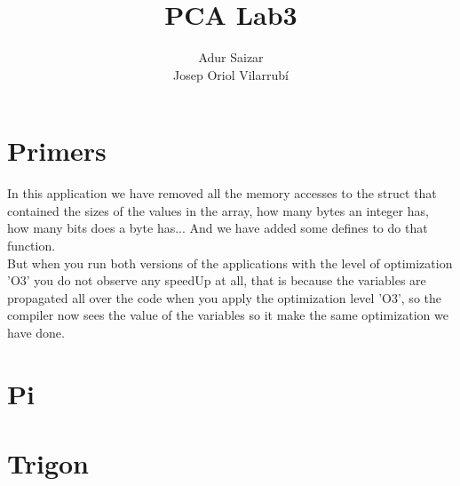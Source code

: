 \documentclass[10pt,a4paper]{article}
\author{Adur Saizar\\ Josep Oriol Vilarrubí}
\title{PCA Lab3}
\begin{document}
\maketitle
\tableofcontents
\pagebreak
\section{Primers}
In this application we have removed all the memory accesses to the struct that contained the sizes of the values in the array, how many bytes an integer has, how many bits does a byte has... And we have added some defines to do that function.\\

But when you run both versions of the applications with the level of optimization 'O3' you do not observe any speedUp at all, that is because the variables are propagated all over the code when you apply the optimization level 'O3', so the compiler now sees the value of the variables so it make the same optimization we have done.
\section{Pi}
\section{Trigon}
\end{document}

